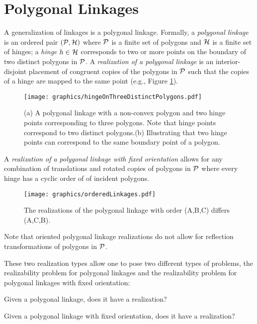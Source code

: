 \section{Polygonal Linkages}
A generalization of linkages is a polygonal linkage.
Formally, a \textit{polygonal linkage} is an ordered pair $\left({\cal P},{\cal H} \right)$ where ${\cal P}$ is a finite set of polygons and ${\cal H}$ is a finite set of hinges; a \textit{hinge} $h\in {\cal H}$ corresponds to two or more points on the boundary of two distinct polygons in ${\cal P}$.  
A \emph{realization of a polygonal linkage} is an interior-disjoint placement of congruent copies of the polygons in ${\cal P}$ such that the copies of a hinge are mapped to the same point (e.g., Figure \ref{fig:linkage-1}).  
\begin{figure}[!htbp]
\begin{center}
\texttt{[image: graphics/hingeOnThreeDistinctPolygons.pdf]}
\end{center} 
\caption{(a) A polygonal linkage with a non-convex polygon and two hinge points corresponding to 
three polygons.  Note that hinge points correspond to two distinct polygons.(b) Illustrating that 
two hinge points can correspond to the same boundary point of a polygon.}
\label{fig:linkage-1}
\end{figure}
A \textit{realization of a polygonal linkage with fixed orientation} allows for any combination of translations and rotated copies of polygons in ${\cal P}$ where every hinge has a cyclic order of  of incident polygons.  
\begin{figure}[!htbp]\label{fig:orderedLinkages}
\begin{center}
\texttt{[image: graphics/orderedLinkages.pdf]}
\end{center} 
\caption{The realizations of the polygonal linkage with order (A,B,C) differs (A,C,B).}
\end{figure}
Note that oriented polygonal linkage realizations do not allow for reflection transformations of polygons in ${\cal P}$.

These two realization types allow one to pose two different types of problems, the realizability problem for polygonal linkages and the realizability problem for polygonal linkages with fixed orientation:
\begin{prob}\label{problem:UnorderedPolygonal}
Given a polygonal linkage, does it have a realization?
\end{prob}
\begin{prob}\label{problem:OrderedPolygonal}
Given a polygonal linkage with fixed orientation, does it have a realization?
\end{prob}

